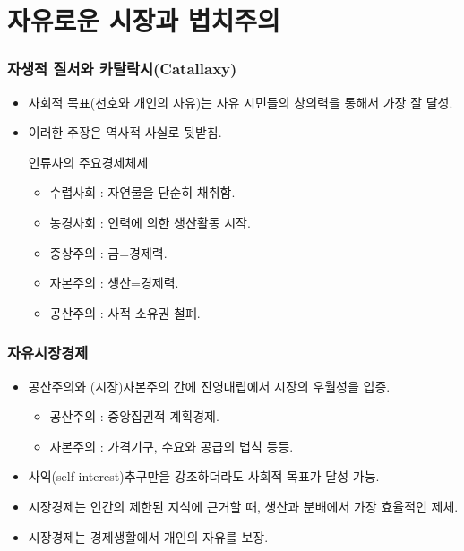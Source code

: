 \documentclass[aspectratio=169,xcolor=dvipsnames,handout]{beamer}
\begin{document}
\section{자유로운 시장과 법치주의}
\begin{frame}[<+->]
\frametitle{자생적 질서와 카탈락시(Catallaxy)}
\begin{itemize}
    \item 사회적 목표(선호와 개인의 자유)는 자유 시민들의 창의력을 통해서 가장 잘 달성.
    \item 이러한 주장은 역사적 사실로 뒷받침.
    \begin{exampleblock}{인류사의 주요경제체제}
    \begin{itemize}
        \item 수렵사회 : 자연물을 단순히 채취함.
        \item 농경사회 : 인력에 의한 생산활동 시작.
        \item 중상주의 : 금=경제력.
        \item 자본주의 : 생산=경제력.
        \item 공산주의 : 사적 소유권 철폐.
    \end{itemize}
    \end{exampleblock}
\end{itemize}
\end{frame}

\begin{frame}[<+->]
\frametitle{자유시장경제}
    \begin{itemize}
    \item 공산주의와 (시장)자본주의 간에 진영대립에서 시장의 우월성을 입증.
    \begin{itemize}
        \item  공산주의 : 중앙집권적 계획경제.
        \item  자본주의 : 가격기구, 수요와 공급의 법칙 등등.
    \end{itemize}
        \item 사익(self-interest)추구만을 강조하더라도 사회적 목표가 달성 가능.
        \item 시장경제는 인간의 제한된 지식에 근거할 때, 생산과 분배에서 가장 효율적인 제체.
        \item 시장경제는 경제생활에서 개인의 자유를 보장.
    \end{itemize}
\end{frame}
\end{document}
